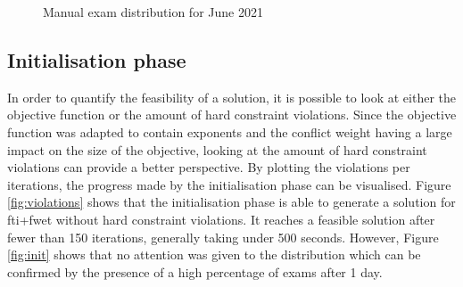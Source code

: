 \begin{figure}[h]
  \centering
  \hfill
  \caption{Manual exam distribution for June 2021}
  \label{fig:manual_sem2}
\end{figure}

\subsection{Initialisation phase}

In order to quantify the feasibility of a solution, it is possible to look at either the objective function or the amount of hard constraint violations. Since the objective function was adapted to contain exponents and the conflict weight having a large impact on the size of the objective, looking at the amount of hard constraint violations can provide a better perspective. By plotting the violations per iterations, the progress made by the initialisation phase can be visualised. Figure \ref{fig:violations} shows that the initialisation phase is able to generate a solution for \acrshort{fti}+\acrshort{fwet} without hard constraint violations. It reaches a feasible solution after fewer than 150 iterations, generally taking under 500 seconds. However, Figure \ref{fig:init} shows that no attention was given to the distribution which can be confirmed by the presence of a high percentage of exams after 1 day.

